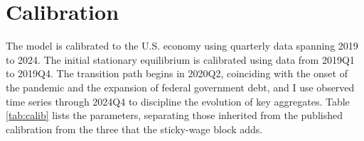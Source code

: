 \section{Calibration} \label{calibration}

The model is calibrated to the U.S. economy using quarterly data spanning 2019
to 2024. The initial stationary equilibrium is calibrated using data from 2019Q1
to 2019Q4. The transition path begins in 2020Q2, coinciding with the onset of
the pandemic and the expansion of federal government debt, and I use observed
time series through 2024Q4 to discipline the evolution of key aggregates.
Table \ref{tab:calib} lists the parameters, separating those inherited from the
published calibration from the three that the sticky-wage block adds.


